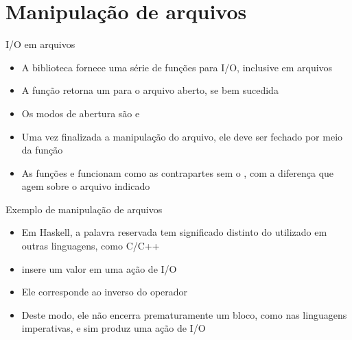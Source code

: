 \section{Manipulação de arquivos}

\begin{frame}[fragile]{I/O em arquivos}

    \begin{itemize}
        \item A biblioteca  fornece uma série de funções para I/O, 
            inclusive em arquivos

        \item A função  retorna um  para o arquivo
            aberto, se bem sucedida


        \item Os modos de abertura são  e

        \item Uma vez finalizada a manipulação do arquivo, ele deve ser fechado por meio da
            função 

        \item As funções  e  funcionam 
            como as contrapartes sem o , com a diferença que agem sobre o
            arquivo indicado
    \end{itemize}

\end{frame}

\begin{frame}[fragile]{Exemplo de manipulação de arquivos}
\end{frame}

\begin{frame}[fragile]{}

    \begin{itemize}
        \item Em Haskell, a palavra reservada  tem significado distinto do
            utilizado em outras linguagens, como C/C++

        \item {} insere um valor em uma ação de I/O

        \item Ele corresponde ao inverso do operador 

        \item Deste modo, ele não encerra prematuramente um bloco, como nas linguagens imperativas,
            e sim produz uma ação de I/O
    \end{itemize}

\end{frame}

